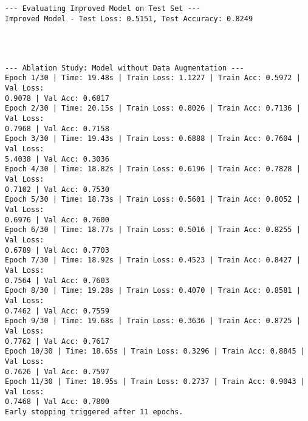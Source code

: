 \documentclass[11pt]{article}
\begin{document}
    \begin{center}
    \end{center}
    { \hspace*{\fill} \\}
    
    \begin{Verbatim}[commandchars=\\\{\}]

--- Evaluating Improved Model on Test Set ---
Improved Model - Test Loss: 0.5151, Test Accuracy: 0.8249
    \end{Verbatim}

    \begin{center}
    \end{center}
    { \hspace*{\fill} \\}
    
    \begin{Verbatim}[commandchars=\\\{\}]

--- Ablation Study: Model without Data Augmentation ---
Epoch 1/30 | Time: 19.48s | Train Loss: 1.1227 | Train Acc: 0.5972 | Val Loss:
0.9078 | Val Acc: 0.6817
Epoch 2/30 | Time: 20.15s | Train Loss: 0.8026 | Train Acc: 0.7136 | Val Loss:
0.7968 | Val Acc: 0.7158
Epoch 3/30 | Time: 19.43s | Train Loss: 0.6888 | Train Acc: 0.7604 | Val Loss:
5.4038 | Val Acc: 0.3036
Epoch 4/30 | Time: 18.82s | Train Loss: 0.6196 | Train Acc: 0.7828 | Val Loss:
0.7102 | Val Acc: 0.7530
Epoch 5/30 | Time: 18.73s | Train Loss: 0.5601 | Train Acc: 0.8052 | Val Loss:
0.6976 | Val Acc: 0.7600
Epoch 6/30 | Time: 18.77s | Train Loss: 0.5016 | Train Acc: 0.8255 | Val Loss:
0.6789 | Val Acc: 0.7703
Epoch 7/30 | Time: 18.92s | Train Loss: 0.4523 | Train Acc: 0.8427 | Val Loss:
0.7564 | Val Acc: 0.7603
Epoch 8/30 | Time: 19.28s | Train Loss: 0.4070 | Train Acc: 0.8581 | Val Loss:
0.7462 | Val Acc: 0.7559
Epoch 9/30 | Time: 19.68s | Train Loss: 0.3636 | Train Acc: 0.8725 | Val Loss:
0.7762 | Val Acc: 0.7617
Epoch 10/30 | Time: 18.65s | Train Loss: 0.3296 | Train Acc: 0.8845 | Val Loss:
0.7626 | Val Acc: 0.7597
Epoch 11/30 | Time: 18.95s | Train Loss: 0.2737 | Train Acc: 0.9043 | Val Loss:
0.7468 | Val Acc: 0.7800
Early stopping triggered after 11 epochs.
    \end{Verbatim}

    \begin{center}
    \end{center}
    { \hspace*{\fill} \\}
    
\end{document}
